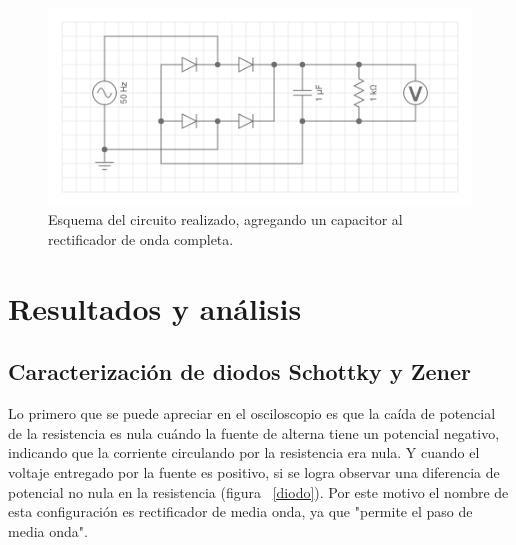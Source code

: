 \documentclass[twoside,twocolumn,a4paper]{article}
\begin{document}
\begin{figure}[h!]
\includegraphics[width=\linewidth]{disp_exp3.png}
\captionsetup{justification=centering}
\caption{Esquema del circuito realizado, agregando un capacitor al rectificador de onda completa.}
\label{fig:disp_exp3}
\end{figure}


\section{Resultados y an\'alisis}

\subsection{Caracterizaci\'on de diodos Schottky y Zener}

Lo primero que se puede apreciar en el osciloscopio es que la ca\'ida de potencial de la resistencia es nula cu\'ando la fuente de alterna tiene un potencial negativo, indicando que la corriente circulando por la resistencia era nula. Y cuando el voltaje entregado por la fuente es positivo, si se logra observar una diferencia de potencial no nula en la resistencia (figura ~\ref{diodo}). Por este motivo el nombre de esta configuraci\'on es rectificador de media onda, ya que "permite el paso de media onda". 
\end{document}
